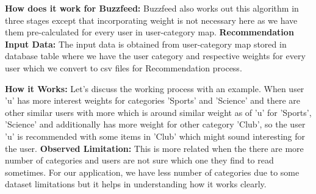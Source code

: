 \textbf{How does it work for Buzzfeed:}
Buzzfeed also works out this algorithm in three stages except that incorporating weight is not necessary here as we have them pre-calculated for every user in user-category map. \newline
\textbf{Recommendation Input Data:} The input data is obtained from user-category map stored in database table where we have the user category and respective weights for every user which we convert to csv files for Recommendation process.

\textbf{How it Works:} 
Let's discuss the working process with an example. When user 'u' has more interest weights for categories 'Sports' and 'Science' and there are other similar users with more which is around similar weight as of 'u' for 'Sports', 'Science' and additionally has more weight for other category 'Club', so the user 'u' is recommended with some items in 'Club' which might sound interesting for the user.\newline
\textbf{Observed Limitation:}
This is more related when the there are more number of categories and users are not sure which one they find to read sometimes. For our application, we have less number of categories due to some dataset limitations but it helps in understanding how it works clearly.
